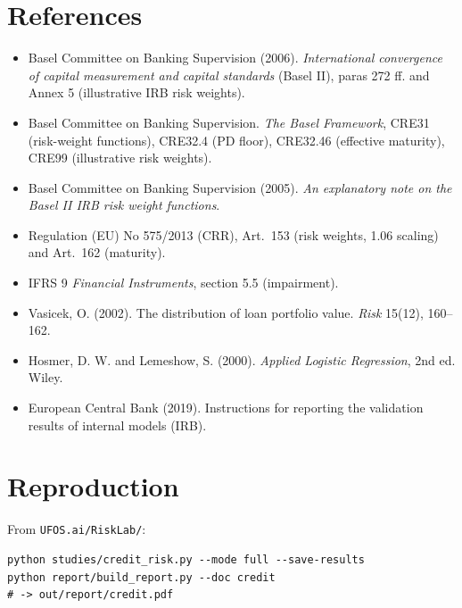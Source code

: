 \documentclass[11pt,a4paper]{article}
\begin{document}
\section*{References}
\begin{itemize}
\item Basel Committee on Banking Supervision (2006). \emph{International convergence of capital measurement and
  capital standards} (Basel II), paras 272 ff. and Annex 5 (illustrative IRB risk weights).
\item Basel Committee on Banking Supervision. \emph{The Basel Framework}, CRE31 (risk-weight functions), CRE32.4 (PD
  floor), CRE32.46 (effective maturity), CRE99 (illustrative risk weights).
\item Basel Committee on Banking Supervision (2005). \emph{An explanatory note on the Basel II IRB risk weight functions}.
\item Regulation (EU) No 575/2013 (CRR), Art.~153 (risk weights, 1.06 scaling) and Art.~162 (maturity).
\item IFRS 9 \emph{Financial Instruments}, section 5.5 (impairment).
\item Vasicek, O. (2002). The distribution of loan portfolio value. \emph{Risk} 15(12), 160--162.
\item Hosmer, D. W. and Lemeshow, S. (2000). \emph{Applied Logistic Regression}, 2nd ed. Wiley.
\item European Central Bank (2019). Instructions for reporting the validation results of internal models (IRB).
\end{itemize}

\appendix
\section{Reproduction}
From \texttt{UFOS.ai/RiskLab/}:
\begin{verbatim}
python studies/credit_risk.py --mode full --save-results
python report/build_report.py --doc credit
# -> out/report/credit.pdf
\end{verbatim}
\end{document}
